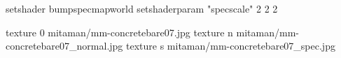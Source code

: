 setshader bumpspecmapworld
setshaderparam "specscale" 2 2 2

texture 0 mitaman/mm-concretebare07.jpg
texture n mitaman/mm-concretebare07_normal.jpg
texture s mitaman/mm-concretebare07_spec.jpg
